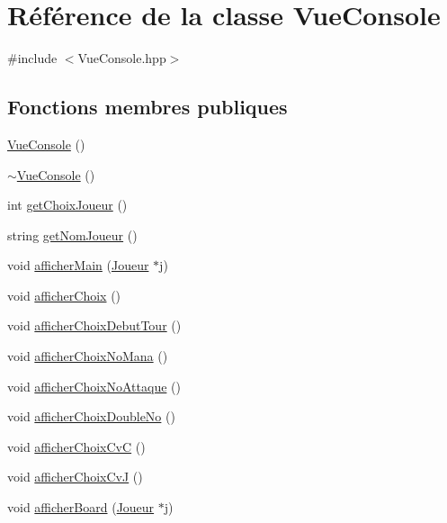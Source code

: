\hypertarget{class_vue_console}{\section{\-Référence de la classe \-Vue\-Console}
\label{class_vue_console}
}


{\ttfamily \#include $<$\-Vue\-Console.\-hpp$>$}

\subsection*{\-Fonctions membres publiques}
\begin{DoxyCompactItemize}
\item 
\hyperlink{class_vue_console_a3fc6ba85609459d0919cf9ad4fc1056a}{\-Vue\-Console} ()
\item 
\hyperlink{class_vue_console_a84554327c266781a3ee5422e1dba674b}{$\sim$\-Vue\-Console} ()
\item 
int \hyperlink{class_vue_console_a8a2212cbdd27511f92f29c222957c80c}{get\-Choix\-Joueur} ()
\item 
string \hyperlink{class_vue_console_a5340da9b0a7fad73fe91b26ec6b20f3b}{get\-Nom\-Joueur} ()
\item 
void \hyperlink{class_vue_console_a0782f21077f7c1be22e798ec445a4d87}{afficher\-Main} (\hyperlink{class_joueur}{\-Joueur} $\ast$j)
\item 
void \hyperlink{class_vue_console_a44d91e29edaa189252dedd1ee643619d}{afficher\-Choix} ()
\item 
void \hyperlink{class_vue_console_a80c7dcfb3eb9a381b37ba46a7ac366af}{afficher\-Choix\-Debut\-Tour} ()
\item 
void \hyperlink{class_vue_console_aeda02f293126db8b72755d223fe2b0e0}{afficher\-Choix\-No\-Mana} ()
\item 
void \hyperlink{class_vue_console_a52c6059b31bcca4000d94fd2578363b8}{afficher\-Choix\-No\-Attaque} ()
\item 
void \hyperlink{class_vue_console_af38fecfa458f233e81f2beeda1610ec3}{afficher\-Choix\-Double\-No} ()
\item 
void \hyperlink{class_vue_console_a12e8a5246c04cd6ba39fdb29c6b3765a}{afficher\-Choix\-Cv\-C} ()
\item 
void \hyperlink{class_vue_console_ad5941f80c25dd4252db2f803cc9ad7e3}{afficher\-Choix\-Cv\-J} ()
\item 
void \hyperlink{class_vue_console_a956e2949c9c9b1485eb734ba20affcf4}{afficher\-Board} (\hyperlink{class_joueur}{\-Joueur} $\ast$j)

\end{DoxyCompactItemize}
